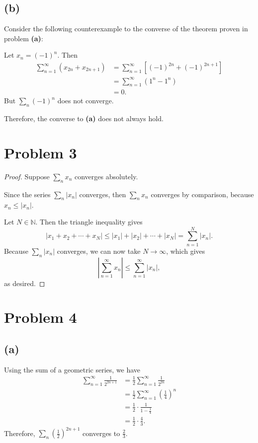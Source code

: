 \documentclass{article}
\begin{document}
\subsection*{(b)}
Consider the following counterexample to the converse of the theorem proven in problem \textbf{(a)}:

Let $x_n = (-1)^n$. Then 
\begin{align}
	\sum_{n=1}^{\infty}\left(x_{2n} +x_{2n+1}\right) &= \sum_{n=1}^{\infty}\left[(-1)^{2n} + (-1)^{2n+1}\right] \\
	&= \sum_{n=1}^{\infty}\left(1^n - 1^n \right) \\
	&= 0.
\end{align}
But $\sum_n (-1)^n$ does not converge. 

Therefore, the converse to \textbf{(a)} does not always hold.
\section*{Problem 3}
\begin{proof}
	Suppose $\sum_n x_n$ converges absolutely.
	
	Since the series $\sum_n |x_n|$ converges, then $\sum_n x_n$ converges by comparison, because $x_n \leq |x_n|$.
	
	Let $N \in \mathbb{N}$. Then the triangle inequality gives
	\begin{equation}
		|x_1 + x_2 + \cdots + x_N| \leq |x_1| + |x_2| + \cdots + |x_N| = \sum_{n=1}^{N}|x_n|.
	\end{equation}
	Because $\sum_n |x_n|$ converges, we can now take $N \to \infty$, which gives
	\begin{equation}
		\left|\sum_{n=1}^{\infty} x_n \right| \leq \sum_{n=1}^{\infty} |x_n|,
	\end{equation}
	as desired.
\end{proof}
\section*{Problem 4}
\subsection*{(a)}
Using the sum of a geometric series, we have
\begin{align}
	\sum_{n=1}^{\infty} \frac{1}{2^{2n+1}} &= \frac{1}{2}\sum_{n=1}^{\infty}\frac{1}{2^{2n}} \\
	&= \frac{1}{2} \sum_{n=1}^{\infty}\left(\frac{1}{4}\right)^n \\
	&= \frac{1}{2} \cdot \frac{1}{1-\frac{1}{4}} \\
	&= \frac{1}{2} \cdot \frac{4}{3}.
\end{align}
Therefore, $\sum_n \left(\frac{1}{2}\right)^{2n+1}$ converges to $\frac{2}{3}$.
\end{document}
